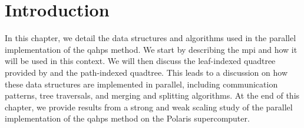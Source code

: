 \section{Introduction}

In this chapter, we detail the data structures and algorithms used in the parallel implementation of the \gls{qahps} method. We start by describing the \gls{mpi} and how it will be used in this context. We will then discuss the leaf-indexed quadtree provided by \pforest and the path-indexed quadtree. This leads to a discussion on how these data structures are implemented in parallel, including communication patterns, tree traversals, and merging and splitting algorithms. At the end of this chapter, we provide results from a strong and weak scaling study of the parallel implementation of the \gls{qahps} method on the Polaris supercomputer.




